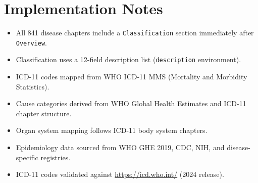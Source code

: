 \section{Implementation Notes}
\label{sec:impl_notes}

\begin{itemize}[noitemsep]
\item All 841 disease chapters include a \texttt{Classification} section immediately after \texttt{Overview}.
\item Classification uses a 12-field description list (\texttt{description} environment).
\item ICD-11 codes mapped from WHO ICD-11 MMS (Mortality and Morbidity Statistics).
\item Cause categories derived from WHO Global Health Estimates and ICD-11 chapter structure.
\item Organ system mapping follows ICD-11 body system chapters.
\item Epidemiology data sourced from WHO GHE 2019, CDC, NIH, and disease-specific registries.
\item ICD-11 codes validated against \url{https://icd.who.int/} (2024 release).
\end{itemize}